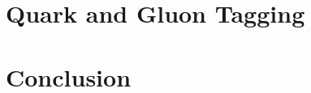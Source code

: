 \chapter{Quark and Gluon Tagging}


\chapter{Conclusion}



\nocite{*}

\singlespacing

\doublespacing


